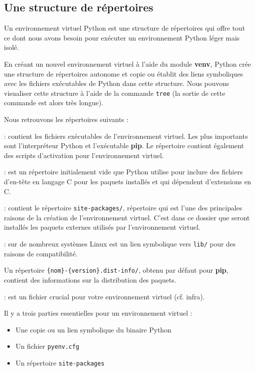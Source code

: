 \subsection*{Une structure de répertoires}

Un environnement virtuel Python est une structure de répertoires qui offre tout ce dont nous avons besoin pour exécuter un environnement Python léger mais isolé.

En créant un nouvel environnement virtuel à l'aide du module \textbf{venv}, Python crée une structure de répertoires autonome et copie ou établit des liens symboliques avec les fichiers exécutables de Python dans cette structure. Nous pouvons visualiser cette structure à l'aide de la commande \texttt{tree} (la sortie de cette commande est alors très longue). 

Nous retrouvons les répertoires suivants :

\begin{description}
    \item[bin/] : contient les fichiers exécutables de l'environnement virtuel. Les plus importants sont l'interpréteur Python et l'exécutable \textbf{pip}. Le répertoire contient également des scripts d'activation pour l'environnement virtuel.
    \item[include/] : est un répertoire initialement vide que Python utilise pour inclure des fichiers d'en-tête en langage C pour les paquets installés et qui dépendent d'extensions en C.
    \item[lib/] : contient le répertoire \texttt{site-packages/}, répertoire qui est l'une des principales raisons de la création de l'environnement virtuel. C'est dans ce dossier que seront installés les paquets externes utilisés par l'environnement virtuel. 
    \item[lib64/] : sur de nombreux systèmes Linux est un lien symbolique vers \texttt{lib/} pour des raisons de compatibilité.
    \item Un répertoire \verb|{nom}-{version}.dist-info/|, obtenu par défaut pour \textbf{pip}, contient des informations sur la distribution des paquets.
    \item[pyvenv.cfg] : est un fichier crucial pour votre environnement virtuel (cf. infra).
\end{description}

Il y a trois parties essentielles pour un environnement virtuel :

\begin{itemize}
    \item Une copie ou un lien symbolique du binaire Python
    \item Un fichier \texttt{pyenv.cfg}
    \item Un répertoire \texttt{site-packages}
\end{itemize}

